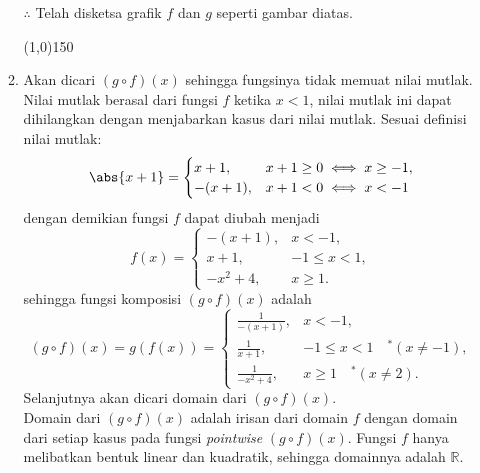 \begin{enumerate}[leftmargin=*, label={\arabic*}.]
\begin{enumerate}[label={\alph*}.]
\begin{center}
\end{center}
$\therefore$ Telah disketsa grafik $f$ dan $g$ seperti gambar diatas.
\begin{center}
    \line(1,0){150}
\end{center}
\item Akan dicari $(g \circ f)(x)$ sehingga fungsinya tidak memuat nilai mutlak.\\
Nilai mutlak berasal dari fungsi $f$ ketika $x < 1$, nilai mutlak ini dapat dihilangkan 
dengan menjabarkan kasus dari nilai mutlak. Sesuai definisi nilai mutlak:
\[
    \abs{x+1} =
    \begin{cases}
    x+1, &x+1 \geq 0 \iff x \geq -1,\\
    -(x+1), &x+1 < 0 \iff x < -1
    \end{cases}
\]
dengan demikian fungsi $f$ dapat diubah menjadi
\[
    f(x) = 
    \begin{cases}
        -(x+1), & x < -1,\\
        x+1, &-1 \leq x < 1,\\
        -x^{2}+4, &x \geq 1.
    \end{cases}
\]
sehingga fungsi komposisi $(g \circ f)(x)$ adalah
\[
    (g\circ f)(x) = g(f(x)) = 
    \begin{cases}
        \frac{1}{-(x+1)}, & x < -1,\\
        \frac{1}{x+1}, &-1 \leq x < 1 \quad ^*(x \neq -1),\\
        \frac{1}{-x^{2}+4}, &x \geq 1 \quad ^*(x \neq 2).
    \end{cases}
\]
Selanjutnya akan dicari domain dari $(g \circ f)(x)$. \\
Domain dari $(g \circ f)(x)$ adalah irisan dari domain $f$ dengan domain dari setiap kasus 
pada fungsi \textit{pointwise} $(g \circ f)(x)$. Fungsi $f$ hanya 
melibatkan bentuk linear dan kuadratik, sehingga domainnya adalah $\mathbb{R}$.\\


\end{enumerate}
\end{enumerate}
